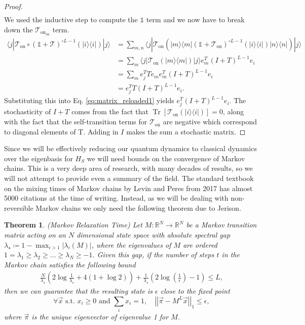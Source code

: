 \documentclass{article}
\newtheorem{theorem}{Theorem}
\newcommand{\on}{\text{on}}
\newcommand{\ket}[1]{|#1\rangle}
\newcommand{\bra}[1]{\langle #1|}
\newcommand{\ketbra}[2]{| #1\rangle\! \langle #2|}
\newcommand{\brackets}[1]{\left[ #1 \right]}
\newcommand{\norm}[1]{\left| \left| #1 \right| \right|}
\DeclareMathOperator{\Tr}{Tr}
\newcommand{\trace}[1]{\Tr \brackets{ #1 }}
\newcommand{\identity}{\mathds{1}}
\begin{document}
\begin{proof}
\begin{align}
\end{align}
We used the inductive step to compute the $\identity$ term and we now have to break down the $\mathcal{T}_{\on}_{\on}$ term. 
\begin{align}
    \bra{j} \mathcal{T}_{\on} \circ (\identity + \mathcal{T})^{\circ L - 1} (\ketbra{i}{i}) \ket{j} &= \sum_{m, n} \bra{j} \mathcal{T}_{\on}\left( \ketbra{m}{m} (\identity + \mathcal{T}_{\on})^{\circ L - 1} (\ketbra{i}{i}) \ketbra{n}{n} \right) \ket{j} \\
    &= \sum_{m} \bra{j} \mathcal{T}_{\on} \left( \ketbra{m}{m} \right) \ket{j} e_m^T (I + T)^{L - 1} e_i \\
    &= \sum_m e_j^T T e_m e_m^T (I + T)^{L -1} e_i \\
    &= e_j^T T(I + T)^{L-1} e_i.
\end{align}
Substituting this into Eq. \eqref{eq:matrix_reloaded1} yields $e_j^T (I + T)^{L-1} e_i$. The stochasticity of $I + T$ comes from the fact that $\trace{\mathcal{T}_{\on}(\ketbra{i}{i})} = 0$, along with the fact that the self-transition terms for $\mathcal{T}_{\on}$ are negative which correspond to diagonal elements of T. Adding in $I$ makes the sum a stochastic matrix.
\end{proof}

Since we will be effectively reducing our quantum dynamics to classical dynamics over the eigenbasis for $H_S$ we will need bounds on the convergence of Markov chains. This is a very deep area of research, with many decades of results, so we will not attempt to provide even a summary of the field. The standard textbook on the mixing times of Markov chains by Levin and Peres \cite{levin2017markov} from 2017 has almost 5000 citations at the time of writing. Instead, as we will be dealing with non-reversible Markov chains we only need the following theorem due to Jerison.
\begin{theorem}(Markov Relaxation Time) \label{thm:markov_chain_bound}
    Let $M : \mathbb{R}^{N} \to  \mathbb{R}^{N}$ be a Markov transition matrix acting on an $N$ dimensional state space with absolute spectral gap $\lambda_{\star} \coloneqq 1 - \max_{i > 1} |\lambda_i(M)|$, where the eigenvalues of $M$ are ordered $1 = \lambda_1 \ge \lambda_2 \ge \ldots \ge \lambda_N \geq -1$. Given this gap, if the number of steps $t$ in the Markov chain satisfies the following bound
    \begin{align}
        \frac{N}{\lambda_{\star}} \left( 2\log \frac{1}{\lambda_{\star}} + 4(1 + \log 2)\right) + \frac{1}{\lambda_{\star}} \left(2 \log \left( \frac{1}{\epsilon} \right) - 1\right) \le L,
    \end{align}
    then we can guarantee that the resulting state is $\epsilon$ close to the fixed point
    \begin{equation}
        \forall \vec{x} \text{ s.t. } x_i \ge 0 \text{ and } \sum_i x_i = 1, \quad \norm{\vec{\pi} - M^L \vec{x}}_1 \le \epsilon,
    \end{equation}
    where $\vec{\pi}$ is the unique eigenvector of eigenvalue 1 for $M$.
\end{theorem}
\end{document}
